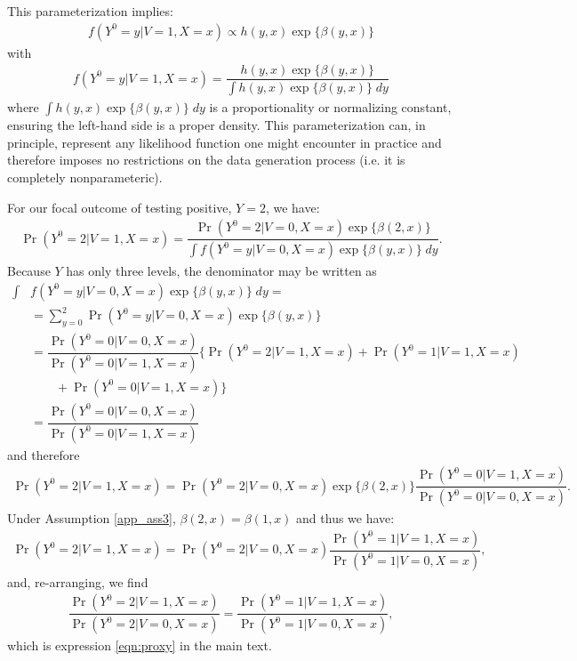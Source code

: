 \begin{appendix}
\begin{refsection}
This parameterization implies:
\begin{align*}
    f(Y^0 = y | V = 1, X = x) \propto h(y, x) \exp\{\beta(y, x)\}
\end{align*}
with 
\begin{align*}
    f(Y^0 = y | V = 1, X = x)  = \dfrac{h(y, x) \exp\{\beta(y, x)\}}{\int h(y, x) \exp\{\beta(y, x)\} \;dy}
\end{align*}
where $\int h(y, x) \exp\{\beta(y, x)\} \;dy$ is a proportionality or normalizing constant, ensuring the left-hand side is a proper density. This parameterization can, in principle, represent any likelihood function one might encounter in practice and therefore imposes no restrictions on the data generation process (i.e. it is completely nonparameteric). 

For our focal outcome of testing positive, $Y = 2$, we have:
\begin{align*}
    \Pr(Y^0 = 2 | V = 1, X = x) = \dfrac{\Pr(Y^0 = 2 | V = 0, X = x)\exp\{\beta(2, x)\}}{\int f(Y^0=y | V = 0, X = x)\exp\{\beta(y, x)\} \;dy}.
\end{align*}
Because $Y$ has only three levels, the denominator may be written as
\begin{align*}
    \int & f(Y^0=y | V = 0, X = x) \exp\{\beta(y, x)\} \;dy =  \\
    &= \sum_{y=0}^2\Pr(Y^0=y| V = 0, X = x)\exp\{\beta(y, x)\} \\
    &= \dfrac{\Pr(Y^0=0| V = 0, X = x)}{\Pr(Y^0=0| V = 1, X = x)} \bigg\{\Pr(Y^0=2| V = 1, X = x) + \Pr(Y^0=1| V = 1, X = x) \\
    &\qquad   + \Pr(Y^0=0| V = 1, X = x) \bigg\} \\  
    &= \dfrac{\Pr(Y^0=0| V = 0, X = x)}{\Pr(Y^0=0| V = 1, X = x)}
\end{align*}
and therefore 
\begin{align*}
    \Pr(Y^0 = 2 | V = 1, X = x) = \Pr(Y^0 = 2 | V = 0, X = x)\exp\{\beta(2, x)\}\dfrac{\Pr(Y^0=0| V = 1, X = x)}{\Pr(Y^0=0| V = 0, X = x)}.
\end{align*}
Under Assumption \ref{app_ass3}, $\beta(2, x) = \beta(1, x)$ and thus we have: 
\begin{align*}
    \Pr(Y^0 = 2 | V = 1, X = x) = \Pr(Y^0 = 2 | V = 0, X = x)\dfrac{\Pr(Y^0 = 1 | V = 1, X = x)}{\Pr(Y^0 = 1| V = 0, X = x)},
\end{align*}
and, re-arranging, we find
\begin{align*}
    \dfrac{\Pr(Y^0 = 2| V = 1, X = x)}{\Pr(Y^0 = 2| V = 0, X = x)} = \dfrac{\Pr(Y^0 = 1 | V = 1, X = x)}{\Pr(Y^0 = 1 | V = 0, X = x)},
\end{align*}
which is expression \ref{eqn:proxy} in the main text. 


\end{refsection}
\end{appendix}
